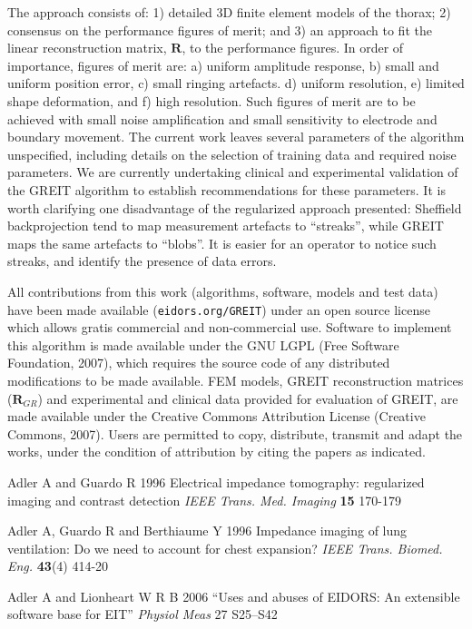\documentclass[12pt]{iopart}
\newcommand{\RB}{\mbox{$\mathbf{R}$}}
\begin{document}
The approach consists of:
1) detailed 3D finite element models of the thorax;
2) consensus on the performance figures of merit;
and
3) an approach to fit the linear reconstruction
 matrix, $\RB$, to the performance figures.
In order of importance, figures of merit are:
a) uniform amplitude response,
b) small and uniform position error,
c) small ringing artefacts.
d) uniform resolution,
e) limited shape deformation, and
f) high resolution.
Such figures of merit are to be achieved with
small noise amplification and
small sensitivity to electrode and boundary movement.
The current work leaves several parameters of the algorithm
unspecified, including details on the selection of training
data and required noise parameters. We are currently undertaking
clinical and experimental validation of the GREIT algorithm
to establish recommendations for these parameters.
It is worth clarifying one disadvantage of the regularized
approach presented: Sheffield backprojection tend to map
measurement artefacts to ``streaks'', while GREIT maps the same
artefacts to ``blobs''. It is easier for an operator to notice
such streaks, and identify the presence of data errors.

All contributions from this work
(algorithms, software, models and test data)
 have been made available (\verb+eidors.org/GREIT+) 
under an open source license which allows
gratis commercial and non-commercial use.
Software to implement this algorithm is made
available under the GNU LGPL (Free Software Foundation, 2007),
which requires the source code of any distributed
 modifications to be made available.
FEM models, GREIT reconstruction matrices ($\RB_{GR}$) and
experimental and clinical data provided for evaluation of GREIT,
are made available under the Creative Commons Attribution
License (Creative Commons, 2007). Users are permitted
to copy, distribute, transmit and adapt the works,
under the condition of attribution by citing the
papers as indicated.



\References %
\item[]
Adler A and Guardo R 1996 Electrical impedance tomography:
regularized imaging and contrast detection {\em IEEE Trans. Med.
Imaging} {\bf 15} 170-179

\item[]
Adler A, Guardo R and Berthiaume Y 1996 Impedance imaging of lung
ventilation: Do we need to account for chest expansion? {\em IEEE
Trans. Biomed. Eng.} {\bf 43}(4) 414-20


\item[]
Adler A and Lionheart W R B 2006
``Uses and abuses of EIDORS: An extensible software base for EIT''
{\em Physiol Meas}
27 S25--S42
\end{document}
